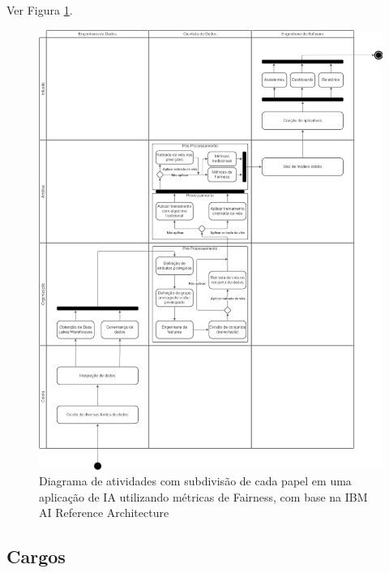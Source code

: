 \documentclass[portugues, 12pt, a4paper]{article}
\begin{document}
Ver Figura \ref{fig:AIRoles}.

\begin{figure}[h]
\centering
\includegraphics[scale=0.32]{images/Diagrama_Atividades.jpg}
\caption {Diagrama de atividades com subdivisão de cada papel em uma aplicação de IA utilizando métricas de Fairness, com base na IBM AI Reference Architecture~\citep{IBM_2021}}
\label{fig:AIRoles}
\end{figure}

\subsection{Cargos}
\end{document}
